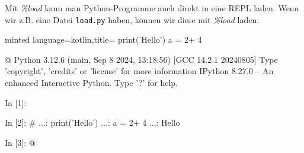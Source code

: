 Mit \textit{\%load} kann man Python-Programme auch direkt in eine REPL laden. Wenn wir z.B. eine Datei \texttt{load.py} haben, können wir diese mit \textit{\%load} laden:
\begin{codeBlock}[]{minted language=kotlin,title=}
    print('Hello')
    a = 2+ 4
\end{codeBlock}
\begin{commandshell}[][minted language=text]
    @\shellprefix@ipython
    Python 3.12.6 (main, Sep  8 2024, 13:18:56) [GCC 14.2.1 20240805]
    Type 'copyright', 'credits' or 'license' for more information
    IPython 8.27.0 -- An enhanced Interactive Python. Type '?' for help.

    In [1]: %

    In [2]: # %
       ...: print('Hello')
       ...: a = 2+ 4
       ...:
    Hello

    In [3]: @\shellcursor@
\end{commandshell}

